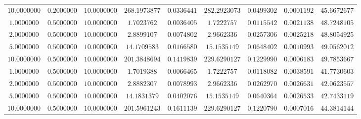 \begin{tabular}{ccccccccc}
$10.0000000$ & $0.2000000$ & $10.0000000$ & $268.1973877$ & $0.0336441$ & $282.2923073$ & $0.0499302$ & $0.0001192$ & $45.6672677$\\
$1.0000000$ & $0.5000000$ & $10.0000000$ & $1.7023762$ & $0.0036405$ & $1.7222757$ & $0.0115542$ & $0.0021138$ & $48.7248105$\\
$2.0000000$ & $0.5000000$ & $10.0000000$ & $2.8899107$ & $0.0074802$ & $2.9662336$ & $0.0257306$ & $0.0025218$ & $48.8054925$\\
$5.0000000$ & $0.5000000$ & $10.0000000$ & $14.1709583$ & $0.0166580$ & $15.1535149$ & $0.0648402$ & $0.0010993$ & $49.0562012$\\
$10.0000000$ & $0.5000000$ & $10.0000000$ & $201.3848694$ & $0.1419839$ & $229.6290127$ & $0.1229990$ & $0.0006183$ & $49.7853667$\\
$1.0000000$ & $0.5000000$ & $10.0000000$ & $1.7019388$ & $0.0066465$ & $1.7222757$ & $0.0118082$ & $0.0038591$ & $41.7730603$\\
$2.0000000$ & $0.5000000$ & $10.0000000$ & $2.8882307$ & $0.0078993$ & $2.9662336$ & $0.0262970$ & $0.0026631$ & $42.0623557$\\
$5.0000000$ & $0.5000000$ & $10.0000000$ & $14.1831379$ & $0.0402076$ & $15.1535149$ & $0.0640364$ & $0.0026533$ & $42.7433119$\\
$10.0000000$ & $0.5000000$ & $10.0000000$ & $201.5961243$ & $0.1611139$ & $229.6290127$ & $0.1220790$ & $0.0007016$ & $44.3814144$\\
\end{tabular}
